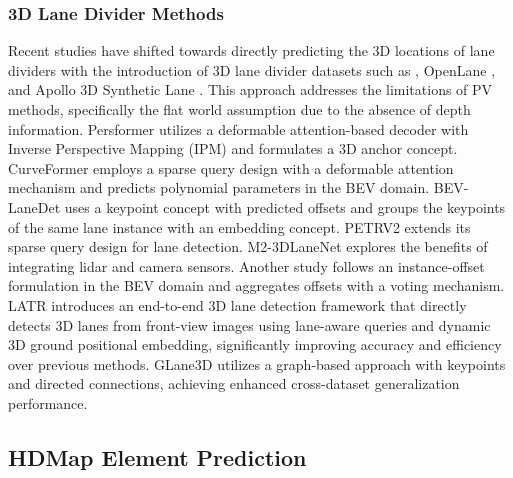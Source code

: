 \subsubsection{3D Lane Divider Methods} Recent studies have shifted towards directly predicting the 3D locations of lane dividers with the introduction of 3D lane divider datasets such as \cite{yan2022once}, OpenLane \cite{chen2022persformer}, and Apollo 3D Synthetic Lane \cite{guo2020gen}. This approach addresses the limitations of PV methods, specifically the flat world assumption due to the absence of depth information. Persformer \cite{chen2022persformer} utilizes a deformable attention-based decoder with Inverse Perspective Mapping (IPM) and formulates a 3D anchor concept. CurveFormer \cite{bai2023curveformer} employs a sparse query design with a deformable attention mechanism and predicts polynomial parameters in the BEV domain. BEV-LaneDet \cite{wang2023bev} uses a keypoint concept with predicted offsets and groups the keypoints of the same lane instance with an embedding concept. PETRV2 \cite{liu2023petrv2} extends its sparse query design for lane detection. M2-3DLaneNet explores the benefits of integrating lidar and camera sensors. Another study \cite{chen2023efficient} follows an instance-offset formulation in the BEV domain and aggregates offsets with a voting mechanism. LATR \cite{luo2023latr} introduces an end-to-end 3D lane detection framework that directly detects 3D lanes from front-view images using lane-aware queries and dynamic 3D ground positional embedding, significantly improving accuracy and efficiency over previous methods. GLane3D \cite{Ozturk2025GLane3D} utilizes a graph-based approach with keypoints and directed connections, achieving enhanced cross-dataset generalization performance.

\subsection{HDMap Element Prediction}

